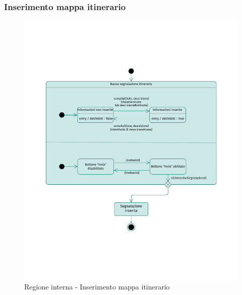 \documentclass{natourDoc}
\begin{document}
	\subsubsection{Inserimento mappa itinerario}
	\begin{figure}[!htbp]
		\centering
		\includegraphics[width=\textwidth, page=4]{./diagrams/statechart.pdf}
		\caption{Regione interna - Inserimento mappa itinerario}
	\end{figure}
	\FloatBarrier

	\newpage
\end{document}
